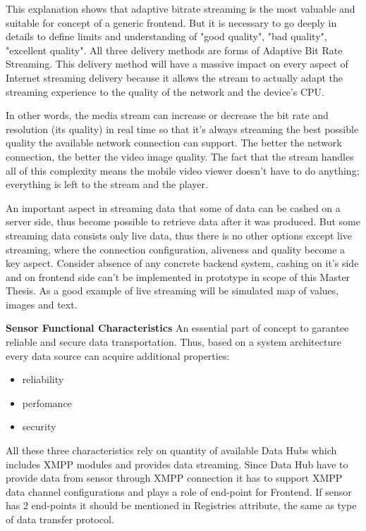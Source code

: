   This explanation shows that adaptive bitrate streaming is the most valuable and suitable for concept of a generic frontend. But it is necessary to go deeply in details to define limits and understanding of "good quality", "bad quality", "excellent quality". All three delivery methods are forms of Adaptive Bit Rate Streaming. This delivery method will have a massive impact on every aspect of Internet streaming delivery because it allows the stream to actually adapt the streaming experience to the quality of the network and the device's CPU.

  In other words, the media stream can increase or decrease the bit rate and resolution (its quality) in real time so that it's always streaming the best possible quality the available network connection can support. The better the network connection, the better the video image quality. The fact that the stream handles all of this complexity means the mobile video viewer doesn't have to do anything; everything is left to the stream and the player.

  An important aspect in streaming data that some of data can be cashed on a server side, thus become possible to retrieve data after it was produced. But some streaming data consists only live data, thus there is no other options except live streaming, where the connection configuration, aliveness and quality become a key aspect. Consider absence of any concrete backend system, cashing on it's side and on frontend side can't be implemented in prototype in scope of this Master Thesis. As a good example of live streaming will be simulated map of values, images and text.

  \textbf{Sensor Functional Characteristics}
  \newline
  An essential part of concept to garantee reliable and secure data transportation. Thus, based on a system architecture every data source can acquire additional properties:
  \begin{itemize}
  \item reliability
  \item perfomance
  \item security
  \end{itemize}
  All these three characteristics rely on quantity of available Data Hubs which includes XMPP modules and provides data streaming. Since Data Hub have to provide data from sensor through XMPP connection it has to support XMPP data channel configurations and plays a role of end-point for Frontend. If sensor has 2 end-points it should be mentioned in Registries attribute, the same as type of data transfer protocol.

